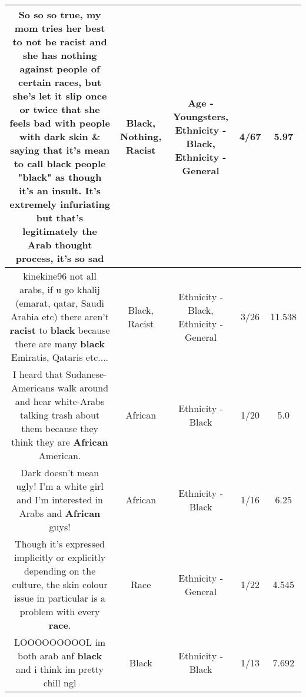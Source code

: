 \documentclass[11pt]{article}
\newlength\mylength
\begin{document}
\begin{center}
\begin{longtable}{|C{.65\mylength}|C{.30\mylength}|C{.12\mylength}|C{.12\mylength}|C{.12\mylength}|}
  \small So so so true, my mom tries her best to not be \textbf{racist} and she has \textbf{nothing} against people of certain races, but she's let it slip once or twice that she feels bad with people with dark skin \& saying that it's mean to call \textbf{black} people "\textbf{black}" as though it's an insult. It's extremely infuriating but that's legitimately the Arab thought process, it's so sad\normalsize   & Black, Nothing, Racist & Age - Youngsters, Ethnicity - Black, Ethnicity - General & 4/67 & 5.97 \\  \hline
  \small kinekine96 not all arabs, if u go khalij (emarat, qatar, Saudi Arabia etc) there aren't \textbf{racist} to \textbf{black} because there are many \textbf{black} Emiratis, Qataris etc....\normalsize   & Black, Racist & Ethnicity - Black, Ethnicity - General & 3/26 & 11.538 \\  \hline
  \small I heard that Sudanese-Americans walk around and hear white-Arabs talking trash about them because they think they are \textbf{African} American.\normalsize   & African & Ethnicity - Black & 1/20 & 5.0 \\  \hline
  \small Dark doesn't mean ugly! I'm a white girl and I'm interested in Arabs and \textbf{African} guys!\normalsize   & African & Ethnicity - Black & 1/16 & 6.25 \\  \hline
  \small Though it's expressed implicitly or explicitly depending on the culture, the skin colour issue in particular is a problem with every \textbf{race}.\normalsize   & Race & Ethnicity - General & 1/22 & 4.545 \\  \hline
  \small LOOOOOOOOOL im both arab anf \textbf{black} and i think im pretty chill ngl\normalsize   & Black & Ethnicity - Black & 1/13 & 7.692 \\  \hline

\end{longtable}
\end{center}
\end{document}
